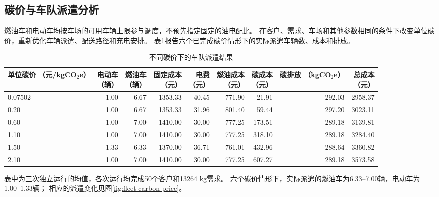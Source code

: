 \documentclass{setp-new}
\begin{document}
\subsection{碳价与车队派遣分析}

燃油车和电动车均按车场的可用车辆上限参与调度，不预先指定固定的油电配比。
在客户、需求、车场和其他参数相同的条件下改变单位碳价，重新优化车辆派遣、配送路径和充电安排。
表\ref{tab:fleet-levels}报告六个已完成碳价情形下的实际派遣车辆数、成本和排放。

\begin{table}[H]
  \centering
  \caption{不同碳价下的车队派遣结果}
  \label{tab:fleet-levels}
  \small
  \setlength{\tabcolsep}{1.1pt}
  \begin{tabular*}{\textwidth}{@{\extracolsep{\fill}}lrrrrrrrr@{}}
    \toprule
    \makecell{单位碳价\\（元/kgCO$_2$e）} & \makecell{电动车\\（辆）} & \makecell{燃油车\\（辆）} & \makecell{固定成本\\（元）} & \makecell{电费\\（元）} & \makecell{燃油成本\\（元）} & \makecell{碳成本\\（元）} & \makecell{碳排放\\（kgCO$_2$e）} & \makecell{总成本\\（元）}\\
    \midrule
    0.07502 & 1.00 & 6.67 & 1353.33 & 40.45 & 771.90 & 21.91 & 292.03 & 2958.37\\
    0.20 & 1.00 & 6.67 & 1353.33 & 31.96 & 801.40 & 59.44 & 297.20 & 3023.11\\
    0.60 & 1.00 & 7.00 & 1410.00 & 30.00 & 777.25 & 173.51 & 289.18 & 3139.81\\
    1.10 & 1.00 & 7.00 & 1410.00 & 30.00 & 777.25 & 318.10 & 289.18 & 3284.40\\
    1.50 & 1.33 & 6.33 & 1370.00 & 36.71 & 761.01 & 432.96 & 288.64 & 3360.82\\
    2.10 & 1.00 & 7.00 & 1410.00 & 30.00 & 777.25 & 607.27 & 289.18 & 3573.58\\
    \bottomrule
  \end{tabular*}
\end{table}

表中为三次独立运行的均值，各次运行均完成50个客户和13264 kg需求。
六个碳价情形下，实际派遣的燃油车为6.33--7.00辆，电动车为1.00--1.33辆；
相应的派遣变化见图\ref{fig:fleet-carbon-price}。
\end{document}
